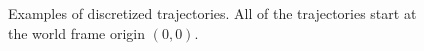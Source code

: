 \documentclass[letterpaper, 10 pt, conference]{ieeeconf}  %
\begin{document}
\begin{figure}[h]
	\centering
	\caption{Examples of discretized trajectories. All of the trajectories start at the world frame origin $(0,0)$.}
	\label{fig:trajs}
\end{figure}
\end{document}
